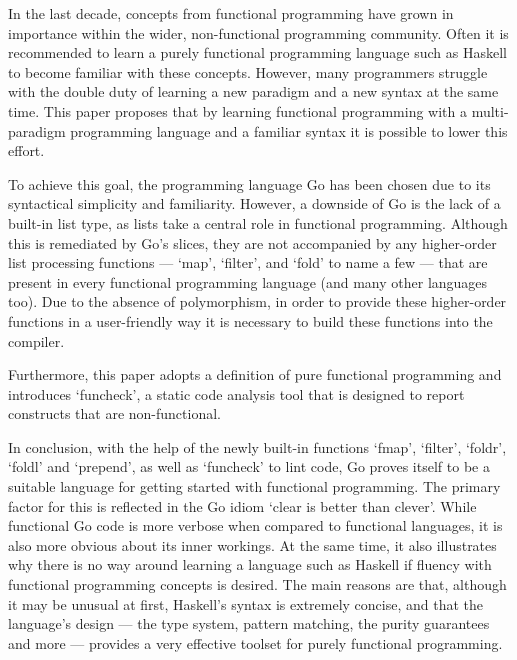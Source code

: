 
In the last decade, concepts from functional programming have grown in
importance within the wider, non-functional programming community.
Often it is recommended to learn a purely functional programming language
such as Haskell to become familiar with these concepts.
However, many programmers struggle with the double duty
of learning a new paradigm and a new syntax at the same time.
This paper proposes that by learning functional programming with a
multi-paradigm programming language and a familiar syntax it is possible
to lower this effort.

To achieve this goal, the programming language Go has been chosen due to
its syntactical simplicity and familiarity.
However, a downside of Go is the lack of a built-in list type, as lists take a
central role in functional programming. Although this is remediated by Go's slices,
they are not accompanied by any higher-order list processing functions --- `map', `filter', and `fold' to name a
few --- that are present in every functional programming language (and many
other languages too).
Due to the absence of polymorphism, in order to provide these higher-order functions in
a user-friendly way it is necessary to build these functions into the compiler.

Furthermore, this paper adopts a definition of pure functional programming and
introduces `funcheck', a static code analysis tool that is designed to
report constructs that are non-functional.

In conclusion, with the help of the newly built-in functions `fmap', `filter', `foldr', `foldl' and
`prepend', as well as `funcheck' to lint code, Go proves itself to be a
suitable language for getting started with functional programming.
The primary factor for this is reflected in the Go idiom `clear is better than clever'.
While functional Go code is more verbose when compared to functional languages, it
is also more obvious about its inner workings.
At the same time, it also illustrates why there is no way around learning a
language such as Haskell if fluency with functional programming concepts
is desired. The main reasons are that, although it may be unusual at first, Haskell's
syntax is extremely concise, and that the language's design --- the type system,
pattern matching, the purity guarantees and more --- provides a very effective toolset
for purely functional programming.

